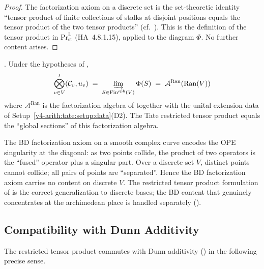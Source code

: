 \begin{proof}
The factorization axiom on a discrete set is the set-theoretic
identity ``tensor product of finite collections of stalks at
disjoint positions equals the tensor product of the two tensor
products'' (cf.~).
This is the definition of the tensor product in
\(\mathrm{Pr}^{\mathrm{L}}_{\mathrm{st}}\) (HA~4.8.1.15), applied to
the diagram \(\Phi\). No further content arises.
\end{proof}

\begin{corollary}
\label{v4-arith:tate:cor:tate-is-factorization-globals}
\ClaimStatusProvedHere. Under the hypotheses of
,
\[
\bigotimes_{v\in V}^{\prime}(\mathcal{C}_{v},u_{v})\;=\;\varinjlim_{S\in\mathrm{Fin}^{\mathrm{sph}}(V)}\Phi(S)\;=\;\mathcal{A}^{\mathrm{Ran}}(\mathrm{Ran}(V))
\]
where \(\mathcal{A}^{\mathrm{Ran}}\) is the factorization algebra of
 together with the
unital extension data of Setup~\ref{v4-arith:tate:setup:data}(D2).
The Tate restricted tensor product equals the ``global sections''
of this factorization algebra.
\end{corollary}

\begin{remark}
\label{v4-arith:tate:rem:factorization-trivial}
The BD factorization axiom on a smooth complex curve encodes the
OPE singularity at the diagonal: as two points collide, the product
of two operators is the ``fused'' operator plus a singular part.
Over a discrete set \(V\), distinct points cannot collide;
all pairs of points are ``separated''. Hence the BD factorization
axiom carries no content on discrete \(V\). The restricted tensor
product formulation of  is the correct generalization
to discrete bases; the BD content that genuinely concentrates at
the archimedean place is handled separately
().
\end{remark}

\subsection{Compatibility with Dunn Additivity}
\label{v4-arith:tate:subsec:dunn-compat}

The restricted tensor product commutes with Dunn additivity
() in the following precise sense.

